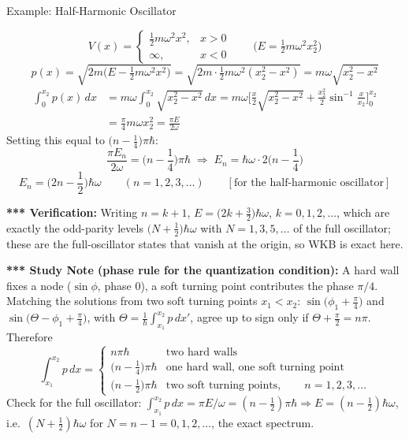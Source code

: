 \documentclass[11pt,a4paper]{article}
\begin{document}
\begin{prob}{Example: Half-Harmonic Oscillator}
\begin{center}
\end{center}
\[
V(x) = \begin{cases}\tfrac12m\omega^2x^2, & x>0\\ \infty, & x<0\end{cases}
\qquad\Big(E=\tfrac12m\omega^2x_2^2\Big)
\]
\[
p(x) = \sqrt{2m\Big(E-\tfrac12m\omega^2x^2\Big)} = \sqrt{2m\cdot\tfrac12m\omega^2(x_2^2-x^2)} = m\omega\sqrt{x_2^2-x^2}
\]
\begin{align*}
\int_0^{x_2}p(x)\,dx &= m\omega\int_0^{x_2}\sqrt{x_2^2-x^2}\,dx = m\omega\Big[\frac x2\sqrt{x_2^2-x^2}+\frac{x_2^2}{2}\sin^{-1}\frac x{x_2}\Big]_0^{x_2}\\
&= \frac\pi4m\omega x_2^2 = \frac{\pi E}{2\omega}
\end{align*}
Setting this equal to $\big(n-\frac14\big)\pi\hbar$:
\[
\frac{\pi E_n}{2\omega} = \Big(n-\frac14\Big)\pi\hbar\;\Rightarrow\; E_n = \hbar\omega\cdot2\Big(n-\frac14\Big)
\]
\[
\boxed{E_n = \Big(2n-\frac12\Big)\hbar\omega\qquad(n=1,2,3,\ldots)}\qquad[\text{for the half-harmonic oscillator}]
\]
\end{prob}
\textbf{*** Verification:} Writing $n=k+1$, $E=\big(2k+\tfrac32\big)\hbar\omega$, $k=0,1,2,\ldots$, which are exactly the odd-parity levels $\big(N+\tfrac12\big)\hbar\omega$ with $N=1,3,5,\ldots$ of the full oscillator; these are the full-oscillator states that vanish at the origin, so WKB is exact here.

\textbf{*** Study Note (phase rule for the quantization condition):} A hard wall fixes a node ($\sin\phi$, phase $0$), a soft turning point contributes the phase $\pi/4$. Matching the solutions from two soft turning points $x_1<x_2$: $\sin\big(\phi_1+\frac\pi4\big)$ and $\sin\big(\Theta-\phi_1+\frac\pi4\big)$, with $\Theta=\frac1\hbar\int_{x_1}^{x_2}p\,dx'$, agree up to sign only if $\Theta+\frac\pi2=n\pi$. Therefore
\[
\int_{x_1}^{x_2}p\,dx = \begin{cases}n\pi\hbar &\text{two hard walls}\\[2pt] \big(n-\tfrac14\big)\pi\hbar &\text{one hard wall, one soft turning point}\\[2pt] \big(n-\tfrac12\big)\pi\hbar &\text{two soft turning points},\qquad n=1,2,3,\ldots\end{cases}
\]
Check for the full oscillator: $\int_{x_1}^{x_2}p\,dx=\pi E/\omega=(n-\frac12)\pi\hbar\Rightarrow E=(n-\frac12)\hbar\omega$, i.e.\ $(N+\frac12)\hbar\omega$ for $N=n-1=0,1,2,\ldots$, the exact spectrum.
\end{document}
